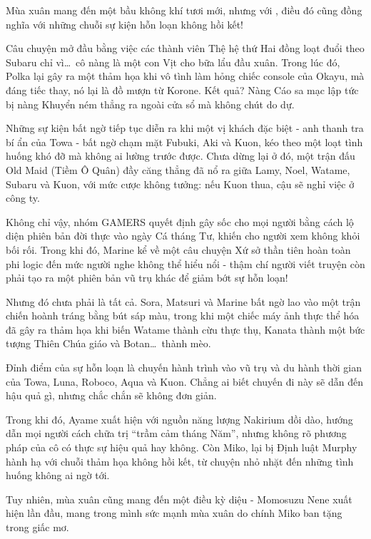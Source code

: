 \documentclass[main.tex]{subfiles}
\begin{document}
\color{black}

Mùa xuân mang đến một bầu không khí tươi mới, nhưng với \hll, điều đó cũng đồng nghĩa với những chuỗi sự kiện hỗn loạn không hồi kết!

Câu chuyện mở đầu bằng việc các thành viên Thệ hệ thứ Hai đồng loạt đuổi theo Subaru chỉ vì\dots\ cô nàng là một con Vịt cho bữa lẩu đầu xuân. Trong lúc đó, Polka lại gây ra một thảm họa khi vô tình làm hỏng chiếc console của Okayu, mà đáng tiếc thay, nó lại là đồ mượn từ Korone. Kết quả? Nàng Cáo sa mạc lập tức bị nàng Khuyển ném thẳng ra ngoài cửa sổ mà không chút do dự.

Những sự kiện bất ngờ tiếp tục diễn ra khi một vị khách đặc biệt - anh thanh tra bí ẩn của Towa - bất ngờ chạm mặt Fubuki, Aki và Kuon, kéo theo một loạt tình huống khó đỡ mà không ai lường trước được. Chưa dừng lại ở đó, một trận đấu Old Maid (Tiềm Ô Quân) đầy căng thẳng đã nổ ra giữa Lamy, Noel, Watame, Subaru và Kuon, với mức cược không tưởng: nếu Kuon thua, cậu sẽ nghỉ việc ở công ty.

Không chỉ vậy, nhóm GAMERS quyết định gây sốc cho mọi người bằng cách lộ diện phiên bản đời thực vào ngày Cá tháng Tư, khiến cho người xem không khỏi bối rối. Trong khi đó, Marine kể về một câu chuyện Xứ sở thần tiên hoàn toàn phi logic đến mức người nghe không thể hiểu nổi - thậm chí người viết truyện còn phải tạo ra một phiên bản vũ trụ khác để giảm bớt sự hỗn loạn!

Nhưng đó chưa phải là tất cả. Sora, Matsuri và Marine bất ngờ lao vào một trận chiến hoành tráng bằng bút sáp màu, trong khi một chiếc máy ảnh thực thể hóa đã gây ra thảm họa khi biến Watame thành cừu thực thụ, Kanata thành một bức tượng Thiên Chúa giáo và Botan\dots\ thành mèo.

Đỉnh điểm của sự hỗn loạn là chuyến hành trình vào vũ trụ và du hành thời gian của Towa, Luna, Roboco, Aqua và Kuon. Chẳng ai biết chuyến đi này sẽ dẫn đến hậu quả gì, nhưng chắc chắn sẽ không đơn giản.

Trong khi đó, Ayame xuất hiện với nguồn năng lượng Nakirium dồi dào, hướng dẫn mọi người cách chữa trị ``trầm cảm tháng Năm'', nhưng không rõ phương pháp của cô có thực sự hiệu quả hay không. Còn Miko, lại bị Định luật Murphy hành hạ với chuỗi thảm họa không hồi kết, từ chuyện nhỏ nhặt đến những tình huống không ai ngờ tới.

Tuy nhiên, mùa xuân cũng mang đến một điều kỳ diệu - Momosuzu Nene xuất hiện lần đầu, mang trong mình sức mạnh mùa xuân do chính Miko ban tặng trong giấc mơ.
\end{document}
